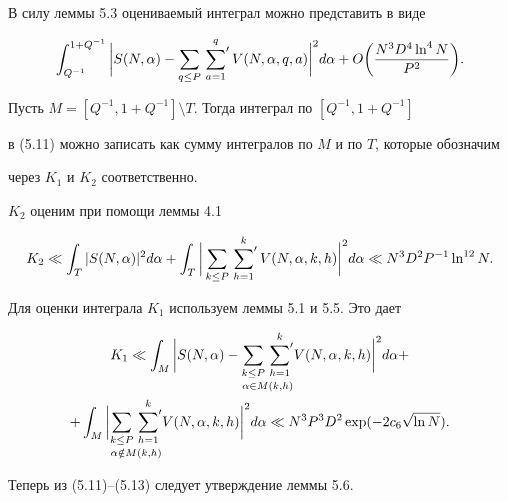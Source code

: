 \begin{pf}


В силу леммы 5.3 оцениваемый интеграл можно представить в виде


\begin{equation}


\int_{Q^{-1}}^{1+Q^{-1}}


\bigg|S(N,\alpha) - \sum_{q\le P}


\sideset{}{'}\sum_{a=1}^q V(N,\alpha, q, a)\bigg|^2 d\alpha +


O\bigg(\frac{N^3D^4\ln^4 N}{P^2}\bigg).


\end{equation}





Пусть $M=[Q^{-1},1+Q^{-1}]\setminus T$. Тогда интеграл по $[Q^{-1},1+Q^{-1}]$


в (5.11) можно записать как сумму интегралов по $M$ и по $T$, которые обозначим


через $K_1$ и $K_2$ соответственно.





$K_2$ оценим при помощи леммы 4.1 


\begin{equation} 


K_2\ll\int_{T}|S(N,\alpha)|^2d\alpha +\int_{T}\bigg|


\sum_{k\le P}\sideset{}{'}\sum_{h=1}^kV(N,\alpha,k,h)\bigg|^2 d\alpha\ll


N^3D^2P^{-1}\ln^{12} N.


\end{equation}





Для оценки интеграла $K_1$ используем леммы 5.1 и 5.5. Это дает


\begin{multline} 


K_1\ll\int_{M}\bigg|S(N,\alpha)-


\underset{\alpha\in M(k,h)}{\sum_{k\le P}\sideset{}{'}\sum_{h=1}^k}{}


V(N,\alpha, k, h)\bigg|^2 d\alpha +\\


+\int_M


\bigg|\underset{\alpha\notin M(k,h)}


{\sum_{k\le P}\sideset{}{'}\sum_{h=1}^k}{}


V(N,\alpha, k, h)\bigg|^2 d\alpha\ll N^3P^3D^2\exp(-2c_6\sqrt{\ln N}).


\end{multline}


Теперь из (5.11)--(5.13) следует утверждение леммы 5.6.


\end{pf}





